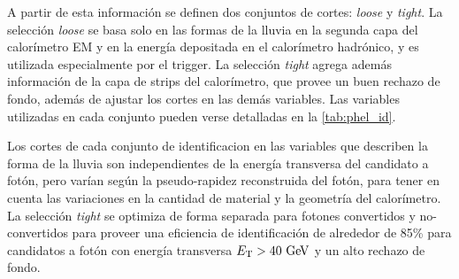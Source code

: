 A partir de esta información se definen dos conjuntos de cortes: \emph{loose} y
\emph{tight}.
La selección \emph{loose} se basa solo en las formas de la lluvia
en la segunda capa del calorímetro EM y en la energía depositada en el
calorímetro hadrónico, y es utilizada especialmente por el trigger. La selección
\emph{tight} agrega además información de la capa de strips del calorímetro, que
provee un buen rechazo de fondo, %
además de ajustar los cortes en las
demás variables. Las variables utilizadas en cada conjunto pueden verse detalladas
en la \cref{tab:phel_id}.

Los cortes de cada conjunto de identificacion en las variables que
describen la forma de la lluvia son independientes de la energía transversa del
candidato a fotón, pero varían según la pseudo-rapidez reconstruida del fotón,
para tener en cuenta las variaciones en la cantidad de material y la geometría
del calorímetro.
La selección \emph{tight} se optimiza de forma separada para
fotones convertidos y no-convertidos para proveer una eficiencia de
identificación de alrededor de 85\% para candidatos a fotón con energía
transversa $\et>40 \gev$ y un alto rechazo de fondo\cite{PhotonPerf}.



